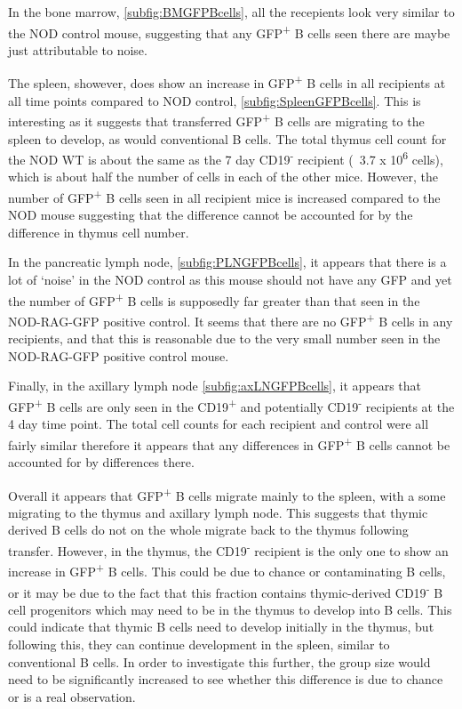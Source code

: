 In the bone marrow, \cref{subfig:BMGFPBcells}, all the recepients look very similar to the NOD control mouse, suggesting that any GFP\textsuperscript{+} B cells seen there are maybe just attributable to noise.

The spleen, showever, does show an increase in GFP\textsuperscript{+} B cells in all recipients at all time points compared to NOD control, \cref{subfig:SpleenGFPBcells}. 
This is interesting as it suggests that transferred GFP\textsuperscript{+} B cells are migrating to the spleen to develop, as would conventional B cells.
The total thymus cell count for the NOD WT is about the same as the 7 day CD19\textsuperscript{-} recipient (~3.7 x 10\textsuperscript{6} cells), which is about half the number of cells in each of the other mice.
However, the number of GFP\textsuperscript{+} B cells seen in all recipient mice is increased compared to the NOD mouse suggesting that the difference cannot be accounted for by the difference in thymus cell number.

In the pancreatic lymph node, \cref{subfig:PLNGFPBcells}, it appears that there is a lot of `noise' in the NOD control as this mouse should not have any GFP and yet the number of GFP\textsuperscript{+} B cells is supposedly far greater than that seen in the NOD-RAG-GFP positive control. 
It seems that there are no GFP\textsuperscript{+} B cells in any recipients, and that this is reasonable due to the very small number seen in the NOD-RAG-GFP positive control mouse.

Finally, in the axillary lymph node \cref{subfig:axLNGFPBcells}, it appears that GFP\textsuperscript{+} B cells are only seen in the CD19\textsuperscript{+} and potentially CD19\textsuperscript{-} recipients at the 4 day time point.
The total cell counts for each recipient and control were all fairly similar therefore it appears that any differences in GFP\textsuperscript{+} B cells cannot be accounted for by differences there.

Overall it appears that GFP\textsuperscript{+} B cells migrate mainly to the spleen, with a some migrating to the thymus and axillary lymph node.
This suggests that thymic derived B cells do not on the whole migrate back to the thymus following transfer.
However, in the thymus, the CD19\textsuperscript{-} recipient is the only one to show an increase in GFP\textsuperscript{+} B cells. 
This could be due to chance or contaminating B cells, or it may be due to the fact that this fraction contains thymic-derived CD19\textsuperscript{-} B cell progenitors which may need to be in the thymus to develop into B cells.
This could indicate that thymic B cells need to develop initially in the thymus, but following this, they can continue development in the spleen, similar to conventional B cells.
In order to investigate this further, the group size would need to be significantly increased to see whether this difference is due to chance or is a real observation.

